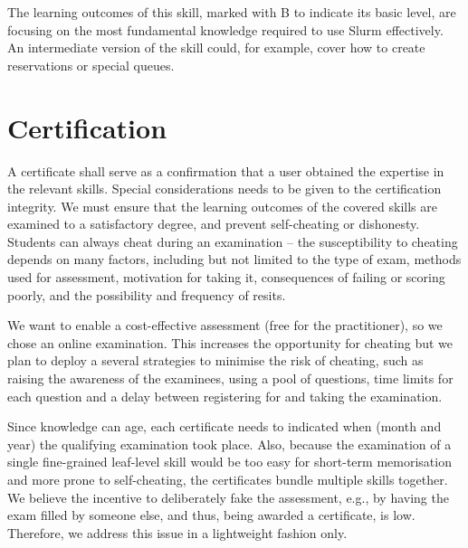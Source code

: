 \documentclass[jocse]{jocseart}
\begin{document}
The learning outcomes of this skill, marked with B to indicate its basic level, are focusing on the most fundamental knowledge required to use Slurm effectively.
An intermediate version of the skill could, for example, cover how to create reservations or special queues.



\section{Certification}
\label{sec:certification}

A certificate shall serve as a confirmation that a user obtained the expertise in the relevant skills.
Special considerations needs to be given to the certification integrity.
We must ensure that the learning outcomes of the covered skills are examined to a satisfactory degree, and prevent self-cheating or dishonesty.
Students can always cheat during an examination -- the susceptibility to cheating depends on many factors, including but not limited to the type of exam, methods used for assessment, motivation for taking it,  consequences of failing or scoring poorly, and the possibility and frequency of resits.

We want to enable a cost-effective assessment (free for the practitioner), so we chose an online examination.
This increases the opportunity for cheating \cite{rowe2004cheating} but we plan to deploy a several strategies to minimise the risk of cheating, such as raising the awareness of the examinees, using a pool of questions, time limits for each question and a delay between registering for and taking the examination.

Since knowledge can age, each certificate needs to indicated when (month and year) the qualifying examination took place.
Also, because the examination of a single fine-grained leaf-level skill would be too easy for short-term memorisation and more prone to self-cheating, the certificates bundle multiple skills together.
We believe the incentive to deliberately fake the assessment, e.g., by having the exam filled by someone else, and thus, being awarded a certificate, is low.
Therefore, we address this issue in a lightweight fashion only.
\end{document}
